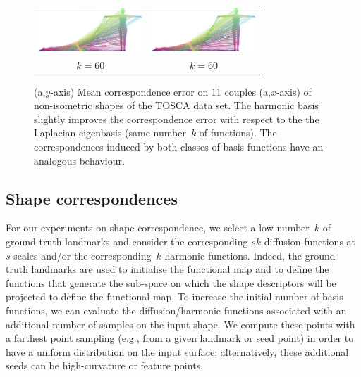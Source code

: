 \documentclass[acmtog,authorversion]{acmart}
\begin{document}
\begin{figure}[t]
\begin{tabular}{c|c}
\includegraphics[width=110pt]{FMAP-images/Source=victoria0-Target=victoria25-General-Basis.jpg}
&\includegraphics[width=110pt]{FMAP-images/Source=victoria0-Target=victoria25-Lapl-Eig-ZOOM.jpg}\\
$k=60$ &$k=60$
\end{tabular}
\caption{(a,$y$-axis) Mean correspondence error on 11 couples (a,$x$-axis) of non-isometric shapes of the TOSCA data set. The harmonic basis slightly improves the correspondence error with respect to the the Laplacian eigenbasis (same number~$k$ of functions). The correspondences induced by both classes of basis functions have an analogous behaviour.\label{fig:VICTORI-CORRESPONDEMCE}}
\end{figure}
%
\subsection{Shape correspondences\label{sec:DISCUSSION-CORRESPONDENCE}}
For our experiments on shape correspondence, we select a low number~$k$ of ground-truth landmarks and consider the corresponding \mbox{$sk$} diffusion functions at~$s$ scales and/or the corresponding~$k$ harmonic functions. Indeed, the ground-truth landmarks are used to initialise the functional map and to define the functions that generate the sub-space on which the shape descriptors will be projected to define the functional map. To increase the initial number of basis functions, we can evaluate the diffusion/harmonic functions associated with an additional number of samples on the input shape. We compute these points with a farthest point sampling (e.g., from a given landmark or seed point) in order to have a uniform distribution on the input surface; alternatively, these additional seeds can be high-curvature or feature points.
\end{document}
